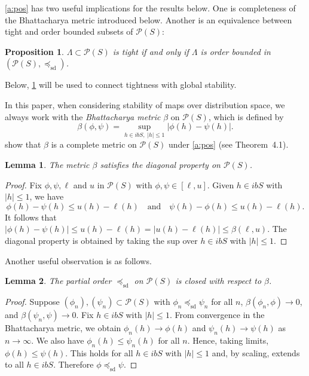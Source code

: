 \documentclass[12pt,reqno]{amsart}
\numberwithin{equation}{section}
\newtheorem{lemma}{Lemma}[section]
\newtheorem{proposition}{Proposition}[section]
\theoremstyle{definition}
\newcommand{\1}{\mathbbm{1}}
\newcommand{\pP}{\mathscr{P}}
\newcommand{\precsd}{\preceq_{\textrm{sd}}}
\newcommand{\navy}[1]{\textit{\textcolor{blue!40!black}{#1}}}
\begin{document}
\cref{a:pos} has two useful implications for the results below.  One is
completeness of the Bhattacharya metric introduced below. Another is an
equivalence between tight and order bounded subsets of $\pP(S)$:

\begin{proposition}\label{p:tiob}
    $\Lambda \subset \pP(S)$ is tight if and only if $\Lambda$ is order bounded
    in $(\pP(S), \precsd)$.
\end{proposition}

Below, \cref{p:tiob} will be used to connect tightness with global stability.


In this paper, when considering stability of maps over distribution space, we
always work with the \navy{Bhattacharya metric} $\beta$ on $\pP(S)$, which is defined by
%
\begin{equation}\label{eq:tvsio}
    \beta(\phi, \psi) 
    = \sup_{h \in ibS, \; |h| \leq 1} |\phi(h) - \psi(h)|.
\end{equation}
%
\cite{kamihigashi2019unified} show that $\beta$ is a complete metric on $\pP(S)$
under \cref{a:pos} (see Theorem~4.1).

\begin{lemma}\label{l:mdi}
    The metric $\beta$ satisfies the diagonal property on $\pP(S)$.
\end{lemma}

\begin{proof}
    Fix $\phi, \psi, \ell$ and $u$ in $\pP(S)$ with $\phi, \psi \in [\ell, u]$.  
    Given $h \in ibS$ with $|h| \leq 1$, we have
    \begin{equation*}
        \phi(h) - \psi(h) \leq u(h) - \ell(h) 
        \quad \text{and} \quad
        \psi(h) - \phi(h) \leq u(h) - \ell(h) .
    \end{equation*}
    It follows that 
        $|\phi(h) - \psi(h)| 
        \leq u(h) - \ell(h) 
        = |u(h) - \ell(h)|
        \leq \beta(\ell, u)$.
    The diagonal property is obtained by taking the sup over $h \in ibS$ with $|h| \leq 1$.
\end{proof}

Another useful observation is as follows.

\begin{lemma}\label{l:betaclosed}
    The partial order $\precsd$ on $\pP(S)$ is closed with respect to $\beta$.
\end{lemma}

\begin{proof}
    Suppose $(\phi_n), (\psi_n) \subset \pP(S)$ with $\phi_n \precsd \psi_n$ for all $n$,
    $\beta(\phi_n, \phi) \to 0$, and $\beta(\psi_n, \psi) \to 0$.
    Fix $h \in ibS$ with $|h| \leq 1$.  From convergence in the Bhattacharya metric, we obtain 
    $\phi_n(h) \to \phi(h)$ and $\psi_n(h) \to \psi(h)$ as
    $n \to \infty$.  We also have $\phi_n(h) \leq \psi_n(h)$ for all $n$.  Hence,
    taking limits, $\phi(h) \leq \psi(h)$.
    This holds for all $h \in ibS$ with $|h| \leq 1$ and, by scaling, extends to all
    $h \in ibS$. Therefore $\phi \precsd \psi$.
\end{proof}
\end{document}
